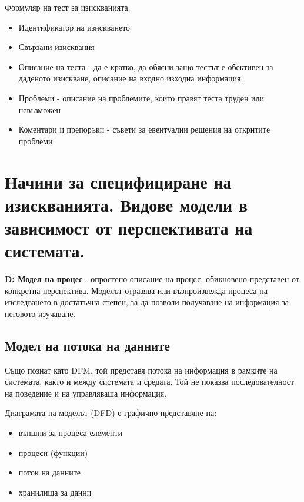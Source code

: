 \documentclass[fleqn,12pt]{article}
\begin{document}
Формуляр на тест за изискванията.
\begin{itemize}
	\item Идентификатор на изискването
	\item Свързани изисквания
	\item Описание на теста - да е кратко, да обясни защо тестът е обективен за даденото изискване, описание на входно изходна информация.
	\item Проблеми - описание на проблемите, които правят теста труден или невъзможен
	\item Коментари и препоръки - съвети за евентуални решения на откритите проблеми.
\end{itemize}

\section{Начини за специфициране на изискванията. Видове модели в зависимост от перспективата  на  системата.}
\textbf{D: Модел на процес} - опростено описание на процес, обикновено представен от конкретна перспектива. Моделът отразява или възпроизвежда процеса на изследването в достатъчна степен, за да позволи получаване на информация за неговото изучаване.

\subsection{Модел  на  потока  на  данните}
Също познат като DFM, той представя потока на информация в рамките на системата, както и между системата и средата. Той не показва последователност на поведение и на управляваша информация.

Диаграмата на моделът (DFD) е графично представяне на:
\begin{itemize}
	\item външни за процеса елементи
	\item процеси (функции)
	\item поток на данните
	\item хранилища за данни
\end{itemize}
\end{document}
